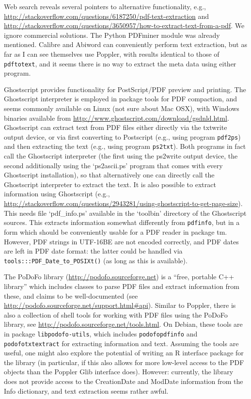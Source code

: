 \documentclass[a4paper]{article}
\newcommand{\file}[1]{`\textsf{#1}'}
\newcommand{\strong}[1]{{\normalfont\fontseries{b}\selectfont #1}}
\let\pkg=\strong
\begin{document}
Web search reveals several pointers to alternative functionality, e.g.,
\url{http://stackoverflow.com/questions/6187250/pdf-text-extraction} and 
\url{http://stackoverflow.com/questions/3650957/how-to-extract-text-from-a-pdf}.
We ignore commercial solutions.  The Python PDFminer module was already
mentioned.  Calibre and Abiword can conveniently perform text
extraction, but as far as I can see themselves use Poppler, with results
identical to those of \verb|pdftotext|, and it seems there is no way to
extract the meta data using either program.

Ghostscript provides functionality for PostScript/PDF preview and
printing.  The Ghostscript interpreter is employed in package
\pkg{tools} for PDF compaction, and seems commonly available on Linux
(not sure about Mac OSX), with Windows binaries available from
\url{http://www.ghostscript.com/download/gsdnld.html}.  Ghostscript can
extract text from PDF files either directly via the txtwrite output
device, or via first converting to Postscript (e.g., using program
\verb|pdf2ps|) and then extracting the text (e.g., using program
\verb|ps2txt|).  Both programs in fact call the Ghostscript interpreter
(the first using the ps2write output device, the second additionally
using the \file{ps2ascii.ps} program that comes with every Ghostscript
installation), so that alternatively one can directly call the
Ghostscript interpreter to extract the text.  It is also possible to
extract information using Ghostscript (e.g.,
\url{http://stackoverflow.com/questions/2943281/using-ghostscript-to-get-page-size}).
This needs file \file{pdf\_info.ps} available in the \file{toolbin}
directory of the Ghostscript sources.  This extracts information
somewhat differently from \verb|pdfinfo|, but in a form which should be
conveniently usable for a PDF reader in package \pkg{tm}.  However, PDF
strings in UTF-16BE are not encoded correctly, and PDF dates are left in
PDF date format: the latter could be handled via
\verb|tools:::PDF_Date_to_POSIXt()| (as long as this is available).

The PoDoFo library (\url{http://podofo.sourceforge.net}) is a ``free,
portable C++ library'' which includes classes to parse PDF files and
extract information from these, and claims to be well-documented (see
\url{http://podofo.sourceforge.net/support.html#api}).  Similar to
Poppler, there is also a collection of shell tools for working with PDF
files using the PoDoFo library, see
\url{http://podofo.sourceforge.net/tools.html}.  On Debian, these tools
are in package \verb|libpodofo-utils|, which includes
\verb|podofopdfinfo| and \verb|podofotxtextract| for extracting
information and text.  Assuming the tools are useful, one might also
explore the potential of writing an R interface package for the library
(in particular, if this also allows for more low-level access to the PDF
objects than the Poppler Glib interface does).  However: currently,
the library does not provide access to the CreationDate and ModDate
information from the Info dictionary, and text extraction seems rather
awful.
\end{document}
